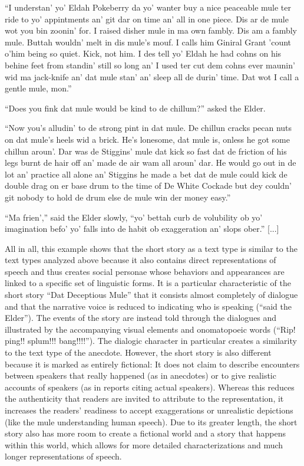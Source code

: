 \begin{ipquote}
\begin{center}
\end{center}
“I understan’ yo’ Eldah Pokeberry da yo’ wanter buy a nice peaceable mule ter ride to yo’ appintments an’ git dar on time an’ all in one piece. Dis ar de mule wot you bin zoonin’ for. I raised disher mule in ma own fambly. Dis am a fambly mule. Buttah wouldn’ melt in dis mule’s mouf. I calls him Giniral Grant ’count o’him being so quiet. Kick, not him. I des tell yo’ Eldah he had cohns on his behine feet from standin’ still so long an’ I used ter cut dem cohns ever maunin’ wid ma jack-knife an’ dat mule stan’ an’ sleep all de durin’ time. Dat wot I call a gentle mule, mon.”

“Do{\kern0pt}es you fink dat mule would be kind to de chillum?” asked the Elder.

“Now you’s alludin’ to de strong pint in dat mule. De chillun cracks pecan nuts on dat mule’s heels wid a brick. He’s lonesome, dat mule is, onless he got some chillun aroun’. Dar was de Stiggins’ mule dat kick so fast dat de friction of his legs burnt de hair off an’ made de air wam all aroun’ dar. He would go out in de lot an’ practice all alone an’ Stiggins he made a bet dat de mule could kick de double drag on er base drum to the time of De White Cockade but dey couldn’ git nobody to hold de drum else de mule win der money easy.”

“Ma frien’,” said the Elder slowly, “yo’ bettah curb de volubility ob yo’ imagination befo’ yo’ falls into de habit ob exaggeration an’ slops ober.” {[...]}
\end{ipquote}

All in all, this example shows that the short story as a text type is similar to the text types analyzed above because it also contains direct representations of speech and thus creates social personae whose behaviors and appearances are linked to a specific set of linguistic forms. It is a particular characteristic of the short story “Dat Deceptious Mule” that it consists almost completely of dialogue and that the narrative voice is reduced to indicating who is speaking (“said the Elder”). The events of the story are instead told through the dialogues and illustrated by the accompanying visual elements and onomatopoeic words (“Rip! ping!! splum!!! bang!!!!”). The dialogic character in particular creates a similarity to the text type of the anecdote. However, the short story is also different because it is marked as entirely fictional: It does not claim to describe encounters between speakers that really happened (as in anecdotes) or to give realistic accounts of speakers (as in reports citing actual speakers). Whereas this reduces the authenticity that readers are invited to attribute to the representation, it increases the readers’ readiness to accept exaggerations or unrealistic depictions (like the mule understanding human speech). Due to its greater length, the short story also has more room to create a fictional world and a story that happens within this world, which allows for more detailed characterizations and much longer representations of speech.

